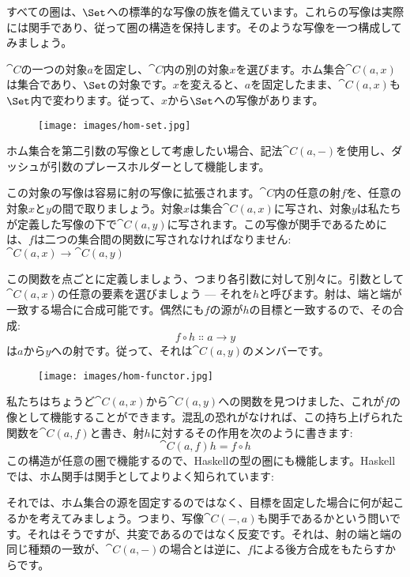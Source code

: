 すべての圏は、$\Set$への標準的な写像の族を備えています。これらの写像は実際には関手であり、従って圏の構造を保持します。そのような写像を一つ構成してみましょう。

$\cat{C}$の一つの対象$a$を固定し、$\cat{C}$内の別の対象$x$を選びます。ホム集合$\cat{C}(a, x)$は集合であり、$\Set$の対象です。$x$を変えると、$a$を固定したまま、$\cat{C}(a, x)$も$\Set$内で変わります。従って、$x$から$\Set$への写像があります。

\begin{figure}[H]
  \centering
  \texttt{[image: images/hom-set.jpg]}
\end{figure}

\noindent
ホム集合を第二引数の写像として考慮したい場合、記法$\cat{C}(a, -)$を使用し、ダッシュが引数のプレースホルダーとして機能します。

この対象の写像は容易に射の写像に拡張されます。$\cat{C}$内の任意の射$f$を、任意の対象$x$と$y$の間で取りましょう。対象$x$は集合$\cat{C}(a, x)$に写され、対象$y$は私たちが定義した写像の下で$\cat{C}(a, y)$に写されます。この写像が関手であるためには、$f$は二つの集合間の関数に写されなければなりません: $\cat{C}(a, x) \to \cat{C}(a, y)$

この関数を点ごとに定義しましょう、つまり各引数に対して別々に。引数として$\cat{C}(a, x)$の任意の要素を選びましょう --- それを$h$と呼びます。射は、端と端が一致する場合に合成可能です。偶然にも$f$の源が$h$の目標と一致するので、その合成: 
\[f \circ h \Colon a \to y\]
は$a$から$y$への射です。従って、それは$\cat{C}(a, y)$のメンバーです。

\begin{figure}[H]
  \centering
  \texttt{[image: images/hom-functor.jpg]}
\end{figure}

\noindent
私たちはちょうど$\cat{C}(a, x)$から$\cat{C}(a, y)$への関数を見つけました、これが$f$の像として機能することができます。混乱の恐れがなければ、この持ち上げられた関数を$\cat{C}(a, f)$と書き、射$h$に対するその作用を次のように書きます: 
\[\cat{C}(a, f) h = f \circ h\]
この構造が任意の圏で機能するので、Haskellの型の圏にも機能します。Haskellでは、ホム関手は関手としてよりよく知られています: 


それでは、ホム集合の源を固定するのではなく、目標を固定した場合に何が起こるかを考えてみましょう。つまり、写像$\cat{C}(-, a)$も関手であるかという問いです。それはそうですが、共変であるのではなく反変です。それは、射の端と端の同じ種類の一致が、$\cat{C}(a, -)$の場合とは逆に、$f$による後方合成をもたらすからです。

